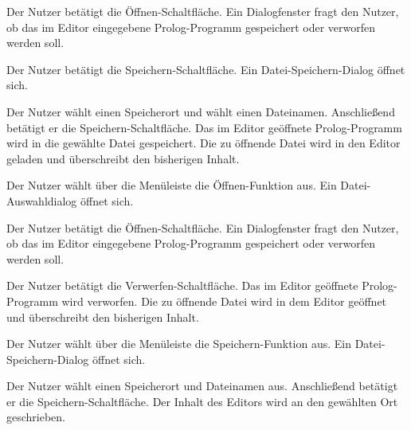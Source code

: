 \documentclass[parskip=full,11pt,twoside]{scrartcl}
\begin{document}
{Der Nutzer betätigt die Öffnen-Schaltfläche.}
{Ein Dialogfenster fragt den Nutzer, ob das im Editor eingegebene Prolog-Programm gespeichert oder verworfen werden soll.}

{Der Nutzer betätigt die Speichern-Schaltfläche.}
{Ein Datei-Speichern-Dialog öffnet sich.}

{Der Nutzer wählt einen Speicherort und wählt einen Dateinamen. Anschließend betätigt er die Speichern-Schaltfläche.}
{Das im Editor geöffnete Prolog-Programm wird in die gewählte Datei gespeichert. Die zu öffnende Datei wird in den Editor geladen und überschreibt den bisherigen Inhalt.}


{Der Nutzer wählt über die Menüleiste die Öffnen-Funktion aus.}
{Ein Datei-Auswahldialog öffnet sich.}

{Der Nutzer betätigt die Öffnen-Schaltfläche.}
{Ein Dialogfenster fragt den Nutzer, ob das im Editor eingegebene Prolog-Programm gespeichert oder verworfen werden soll.}

{Der Nutzer betätigt die Verwerfen-Schaltfläche.}
{Das im Editor geöffnete Prolog-Programm wird verworfen. Die zu öffnende Datei wird in dem Editor geöffnet und überschreibt den bisherigen Inhalt.}


{Der Nutzer wählt über die Menüleiste die Speichern-Funktion aus.}
{Ein Datei-Speichern-Dialog öffnet sich.}

{Der Nutzer wählt einen Speicherort und Dateinamen aus. Anschließend betätigt er die Speichern-Schaltfläche.}
{Der Inhalt des Editors wird an den gewählten Ort geschrieben.}
\end{document}
